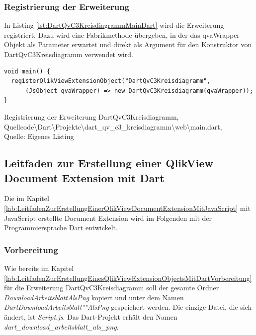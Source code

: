 \subsubsection{Registrierung der Erweiterung}

In Listing \ref {lst:DartQvC3KreisdiagrammMainDart} wird die Erweiterung registriert. Dazu wird eine Fabrikmethode übergeben, in der das qvaWrapper-Objekt als Parameter erwartet und direkt als Argument für den Konstruktor von DartQvC3Kreisdiagramm verwendet wird.


\ifIncludeFigures\begin{listing}[htbp]
\begin{verbatim}
void main() {  
  registerQlikViewExtensionObject("DartQvC3Kreisdiagramm", 
      (JsObject qvaWrapper) => new DartQvC3Kreisdiagramm(qvaWrapper));
}
\end{verbatim}
\caption[Registrierung der Erweiterung DartQvC3Kreisdiagramm]{Registrierung der Erweiterung DartQvC3Kreisdiagramm, \\Quellcode\textbackslash{}Dart\textbackslash{}Projekte\textbackslash{}dart\_qv\_c3\_kreisdiagramm\textbackslash{}web\textbackslash{}main.dart, \\Quelle: Eigenes Listing}
\label{lst:DartQvC3KreisdiagrammMainDart}
\end{listing}\fi

\newpage
\subsection{Leitfaden zur Erstellung einer QlikView Document Extension mit Dart}


Die im Kapitel \ref{lab:LeitfadenZurErstellungEinerQlikViewDocumentExtensionMitJavaScript} mit JavaScript erstellte Document Extension wird im Folgenden mit der Programmiersprache Dart entwickelt.

\subsubsection{Vorbereitung}

Wie bereits im Kapitel \ref{lab:LeitfadenZurErstellungEinesQlikViewExtensionObjectsMitDartVorbereitung} für die Erweiterung DartQvC3Kreisdiagramm soll der gesamte Ordner \textit{DownloadArbeitsblattAlsPng} kopiert und unter dem Namen \textit{DartDownloadArbeitsblatt""AlsPng} gespeichert werden. Die einzige Datei, die sich ändert, ist \textit{Script.js}. Das Dart-Projekt erhält den Namen \textit{dart\_download\_arbeitsblatt\_als\_png}.

